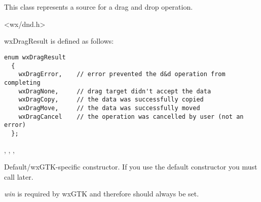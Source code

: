 \section{}\label{wxdropsource}


This class represents a source for a drag and drop operation.




<wx/dnd.h>


wxDragResult is defined as follows:

{\small\begin{verbatim}
enum wxDragResult
  {
    wxDragError,    // error prevented the d&d operation from completing
    wxDragNone,     // drag target didn't accept the data
    wxDragCopy,     // the data was successfully copied
    wxDragMove,     // the data was successfully moved
    wxDragCancel    // the operation was cancelled by user (not an error)
  };
\end{verbatim}%
}


, , 
, 


\label{wxdropsourcewxdropsource}


Default/wxGTK-specific constructor. If you use the default constructor you must
call  later.

{\it win} is required by wxGTK and therefore should always be set.





